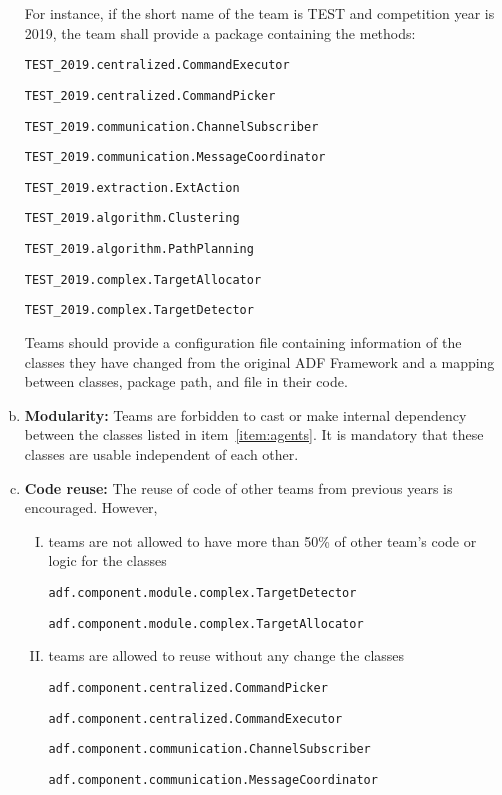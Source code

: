 \documentclass{article}
\begin{document}
\begin{enumerate}[(a)]
\normalsize
For instance, if the short name of the team is TEST and competition year is 2019, the team shall provide a package containing the methods:

\small

\texttt{TEST\_2019.centralized.CommandExecutor}

\texttt{TEST\_2019.centralized.CommandPicker}

\texttt{TEST\_2019.communication.ChannelSubscriber}

\texttt{TEST\_2019.communication.MessageCoordinator}

\texttt{TEST\_2019.extraction.ExtAction}

\texttt{TEST\_2019.algorithm.Clustering}

\texttt{TEST\_2019.algorithm.PathPlanning}

\texttt{TEST\_2019.complex.TargetAllocator}

\texttt{TEST\_2019.complex.TargetDetector}

\normalsize


Teams should provide a configuration file containing information of the classes they have changed from the original ADF Framework and a mapping between classes, package path, and file in their code. \label{item:agents}
\item \textbf{Modularity:} Teams are forbidden to cast or make internal dependency between the classes listed in item~\ref{item:agents}. It is mandatory that these classes are usable independent of each other.
\item \textbf{Code reuse:} The reuse of code of other teams from previous years is encouraged. However,

\begin{enumerate}[I.]
  \item teams are not allowed to have more than 50\% of other team's code or logic for the classes

  \small
  \texttt{adf.component.module.complex.TargetDetector}

  \texttt{adf.component.module.complex.TargetAllocator}
  \item teams are allowed to reuse without any change the classes

  \small
  \texttt{adf.component.centralized.CommandPicker}

  \texttt{adf.component.centralized.CommandExecutor}

  \texttt{adf.component.communication.ChannelSubscriber}

  \texttt{adf.component.communication.MessageCoordinator}


\end{enumerate}
\end{enumerate}
\end{document}

